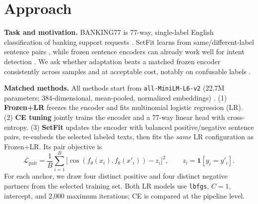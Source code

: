 \documentclass{article}
\title{#1\\[0.7em]
  {\normalsize\normalfont Columbia COMS 4705 Project Milestone}\\[0.8em]
  \parbox{0.95\textwidth}{\normalfont\small\centering
    \textbf{Keywords:} \textit{#2}\par\vspace{0.4em}
    \textbf{TA Mentor:} #3\par}}%
\author{
  Tian Zhou \\
  Columbia University \\
  \texttt{tz2751@columbia.edu}
  \And
  Liping Zhu \\
  Columbia University \\
  \texttt{lz3147@columbia.edu}
  \And
  Jim Lu \\
  Columbia University \\
  \texttt{yl6325@columbia.edu}
}
\begin{document}
\maketitle

\begin{abstract}
We study whether SetFit's pairwise representation adaptation improves fine-grained banking intent detection enough to justify its cost. On BANKING77 with 8 and 32 examples per intent, we compare SetFit with frozen embeddings plus logistic regression (Frozen+LR) and cross-entropy (CE) tuning from the same encoder and samples. Over three paired seeds, SetFit (78.6/87.1 test macro-F1) matches but does not beat Frozen+LR (78.8/87.3) at 26--37$\times$ its training time; both beat CE (70.6/83.6). SetFit's validation score peaks at its first checkpoint in every final run, which our next experiments examine.
\end{abstract}

\section{Approach}
\textbf{Task and motivation.} BANKING77 is 77-way, single-label English classification of banking support requests \citep{casanueva2020efficient,polyai2020banking77}. SetFit learns from same/different-label sentence pairs \citep{tunstall2022setfit}, while frozen sentence encoders can already work well for intent detection \citep{ma2022sentence}. We ask whether adaptation beats a matched frozen encoder consistently across samples and at acceptable cost, notably on confusable labels \citep{zhang2025clear}.

\textbf{Matched methods.} All methods start from \texttt{all-MiniLM-L6-v2} (22.7M parameters; 384-dimensional, mean-pooled, normalized embeddings) \citep{minilm2026}. (1) \textbf{Frozen+LR} freezes the encoder and fits multinomial logistic regression (LR). (2) \textbf{CE tuning} jointly trains the encoder and a 77-way linear head with cross-entropy. (3) \textbf{SetFit} updates the encoder with balanced positive/negative sentence pairs, re-embeds the selected labeled texts, then fits the \emph{same} LR configuration as Frozen+LR. Its pair objective is
\begin{equation}
  \mathcal{L}_{\mathrm{pair}}=\frac{1}{B}\sum_{i=1}^{B}
  \bigl[\cos(f_{\theta}(x_i),f_{\theta}(x'_i))-z_i\bigr]^2,
  \qquad z_i=\mathbf{1}[y_i=y'_i].
\end{equation}
For each anchor, we draw four distinct positive and four distinct negative partners from the selected training set. Both LR models use \texttt{lbfgs}, $C=1$, intercept, and 2,000 maximum iterations; CE is compared at the pipeline level.
\end{document}

